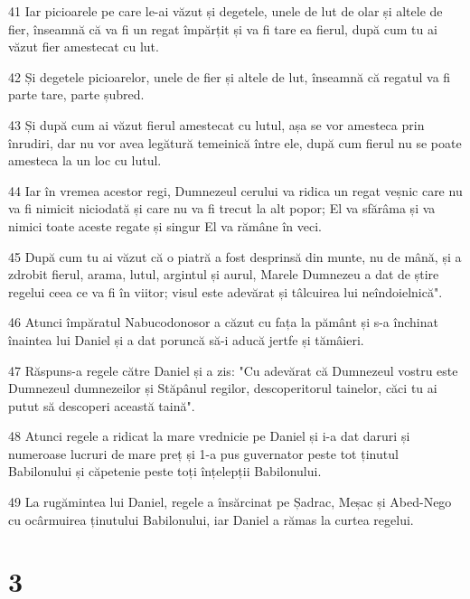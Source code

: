 \par 41 Iar picioarele pe care le-ai văzut și degetele, unele de lut de olar și altele de fier, înseamnă că va fi un regat împărțit și va fi tare ea fierul, după cum tu ai văzut fier amestecat cu lut.
\par 42 Și degetele picioarelor, unele de fier și altele de lut, înseamnă că regatul va fi parte tare, parte șubred.
\par 43 Și după cum ai văzut fierul amestecat cu lutul, așa se vor amesteca prin înrudiri, dar nu vor avea legătură temeinică între ele, după cum fierul nu se poate amesteca la un loc cu lutul.
\par 44 Iar în vremea acestor regi, Dumnezeul cerului va ridica un regat veșnic care nu va fi nimicit niciodată și care nu va fi trecut la alt popor; El va sfărâma și va nimici toate aceste regate și singur El va rămâne în veci.
\par 45 După cum tu ai văzut că o piatră a fost desprinsă din munte, nu de mână, și a zdrobit fierul, arama, lutul, argintul și aurul, Marele Dumnezeu a dat de știre regelui ceea ce va fi în viitor; visul este adevărat și tâlcuirea lui neîndoielnică".
\par 46 Atunci împăratul Nabucodonosor a căzut cu fața la pământ și s-a închinat înaintea lui Daniel și a dat poruncă să-i aducă jertfe și tămâieri.
\par 47 Răspuns-a regele către Daniel și a zis: "Cu adevărat că Dumnezeul vostru este Dumnezeul dumnezeilor și Stăpânul regilor, descoperitorul tainelor, căci tu ai putut să descoperi această taină".
\par 48 Atunci regele a ridicat la mare vrednicie pe Daniel și i-a dat daruri și numeroase lucruri de mare preț și 1-a pus guvernator peste tot ținutul Babilonului și căpetenie peste toți înțelepții Babilonului.
\par 49 La rugămintea lui Daniel, regele a însărcinat pe Șadrac, Meșac și Abed-Nego cu ocârmuirea ținutului Babilonului, iar Daniel a rămas la curtea regelui.

\chapter{3}

